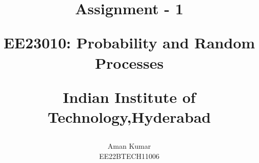 \documentclass[journal,12pt,twocolumn]{IEEEtran}
\theoremstyle{remark}
\begin{document}
%




\vspace{3cm}

\title{
Assignment - 1

\Large{EE23010: Probability and Random Processes}

Indian Institute of Technology,Hyderabad
}
\author{ Aman Kumar 

EE22BTECH11006
}	


%
%
%

% 
%



% 
\end{document}
